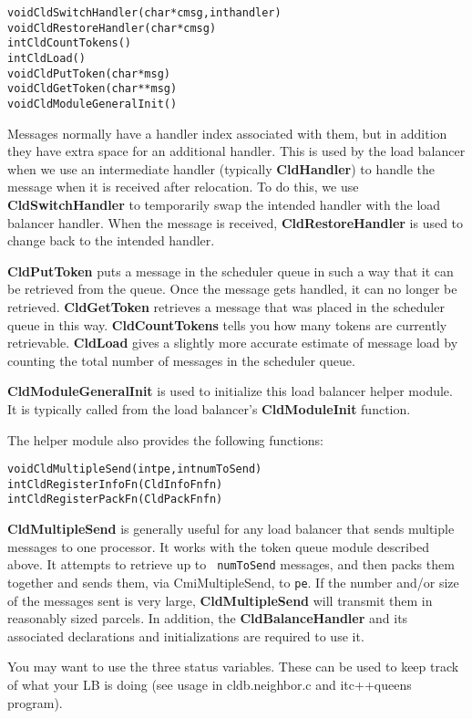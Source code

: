 \begin{alltt}
void CldSwitchHandler(char *cmsg, int handler)
void CldRestoreHandler(char *cmsg)
int CldCountTokens()
int CldLoad()
void CldPutToken(char *msg)
void CldGetToken(char **msg)
void CldModuleGeneralInit()
\end{alltt}

Messages normally have a handler index associated with them, but in addition
they have extra space for an additional handler.  This is used by the
load balancer when we use an intermediate handler (typically {\bf
CldHandler}) to handle the message when it is received after
relocation.  To do this, we use {\bf CldSwitchHandler} to temporarily
swap the intended handler with the load balancer handler.  When the
message is received, {\bf CldRestoreHandler} is used to change back to
the intended handler. 

{\bf CldPutToken} puts a message in the scheduler queue in such a way
that it can be retrieved from the queue. Once the message gets
handled, it can no longer be retrieved.  {\bf CldGetToken} retrieves a
message that was placed in the scheduler queue in this way.
{\bf CldCountTokens} tells you how many tokens are currently
retrievable. {\bf CldLoad} gives a slightly more accurate estimate of
message load by counting the total number of messages in the
scheduler queue.

{\bf CldModuleGeneralInit} is used to initialize this load balancer
helper module.  It is typically called from the load balancer's {\bf
CldModuleInit} function.

The helper module also provides the following functions:

\begin{alltt}
void CldMultipleSend(int pe, int numToSend)
int CldRegisterInfoFn(CldInfoFn fn)
int CldRegisterPackFn(CldPackFn fn)
\end{alltt}

{\bf CldMultipleSend} is generally useful for any load balancer that
sends multiple messages to one processor.  It works with the token
queue module described above.  It attempts to retrieve up to {\tt
numToSend} messages, and then packs them together and sends them, via
CmiMultipleSend, to {\tt pe}.  If the number and/or size of the
messages sent is very large, {\bf CldMultipleSend} will transmit them
in reasonably sized parcels.  In addition, the {\bf CldBalanceHandler} and
its associated declarations and initializations are required to use it.

You may want to use the three status variables.  These can be used to
keep track of what your LB is doing (see usage in cldb.neighbor.c and
itc++queens program).

